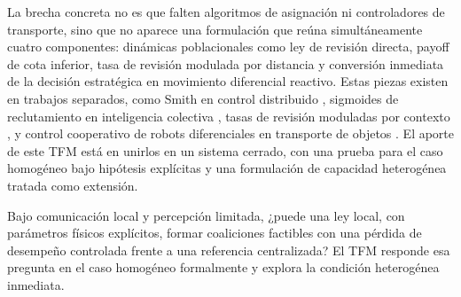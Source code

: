 La brecha concreta no es que falten algoritmos de asignación ni controladores de
transporte, sino que no aparece una formulación que reúna simultáneamente cuatro
componentes: dinámicas poblacionales como ley de revisión directa, payoff de cota
inferior, tasa de revisión modulada por distancia y conversión inmediata de la decisión
estratégica en movimiento diferencial reactivo. Estas piezas existen en trabajos
separados, como Smith en control distribuido \citep{barreiro2017distributed}, sigmoides
de reclutamiento en inteligencia colectiva \citep{theraulaz1999stigmergy,
brambilla2013swarm}, tasas de revisión moduladas por contexto
\citep{sandholm2010population}, y control cooperativo de robots diferenciales en
transporte de objetos \citep{ebel2024cooperative,rosenfelder2024force}. El aporte de
este TFM está en unirlos en un sistema cerrado, con una prueba para el caso homogéneo
bajo hipótesis explícitas y una formulación de capacidad heterogénea tratada como
extensión.

Bajo comunicación local y percepción limitada, ¿puede una ley local, con parámetros
físicos explícitos, formar coaliciones factibles con una pérdida de desempeño controlada
frente a una referencia centralizada? El TFM responde esa pregunta en el caso homogéneo formalmente y explora la condición heterogénea inmediata.
